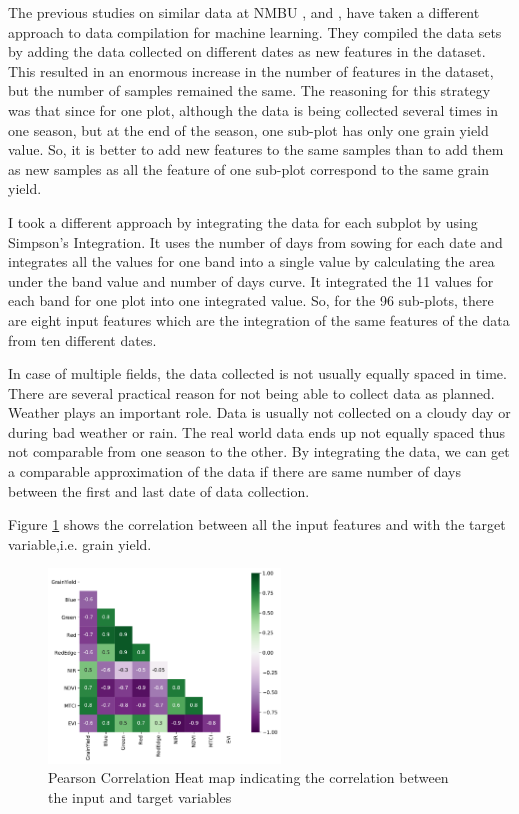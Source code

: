 \documentclass[sigconf, nonacm, natbib, screen, balance=False]{acmart}
\begin{document}
The previous studies on similar data at NMBU \cite{burud_bleken}, \cite{grindbakken} and \cite{lied}, \cite{shafiee2021} have taken a different approach to data compilation for machine learning. They compiled the data sets by adding the data collected on different dates as new features in the dataset. This resulted in an enormous increase in the number of features in the dataset, but the number of samples remained the same. The reasoning for this strategy was that since for one plot, although the data is being collected several times in one season, but at the end of the season, one sub-plot has only one grain yield value. So, it is better to add new features to the same samples than to add them as new samples as all the feature of one sub-plot correspond to the same grain yield.

I took a different approach by integrating the data for each subplot by using Simpson's Integration\cite{Simpsons2:online}. It uses the number of days from sowing for each date and integrates all the values for one band into a single value by calculating the area under the band value and number of days curve. It integrated the 11 values for each band for one plot into one integrated value. So, for the 96 sub-plots, there are eight input features which are the integration of the same features of the data from ten different dates. 

In case of multiple fields, the data collected is not usually equally spaced in time. There are several practical reason for not being able to collect data as planned. Weather plays an important role. Data is usually not collected on a cloudy day or during bad weather or rain. The real world data ends up not equally spaced thus not comparable from one season to the other. By integrating the data, we can get a comparable approximation of the data if there are same number of days between the first and last date of data collection.

Figure \ref{fig:heatmap} shows the correlation between all the input features and with the target variable,i.e. grain yield.

\begin{figure}[!h]
   \hspace*{-0.25in}
   \includegraphics[width=0.55\textwidth, angle=0,]{heatmap.pdf}
  \caption{Pearson Correlation Heat map indicating the correlation between the input and target variables}
  \label{fig:heatmap}
\end{figure}
\end{document}
